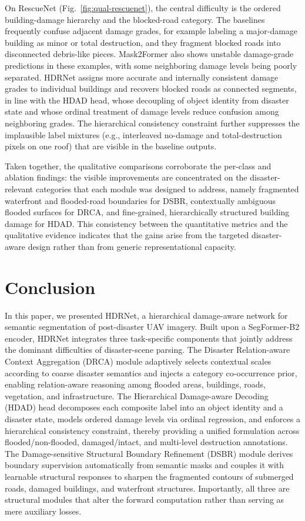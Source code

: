 \documentclass[lettersize,journal]{IEEEtran}
\begin{document}
On RescueNet (Fig.~\ref{fig:qual-rescuenet}), the central difficulty is the ordered building-damage hierarchy and the blocked-road category. The baselines frequently confuse adjacent damage grades, for example labeling a major-damage building as minor or total destruction, and they fragment blocked roads into disconnected debris-like pieces. Mask2Former also shows unstable damage-grade predictions in these examples, with some neighboring damage levels being poorly separated. HDRNet assigns more accurate and internally consistent damage grades to individual buildings and recovers blocked roads as connected segments, in line with the HDAD head, whose decoupling of object identity from disaster state and whose ordinal treatment of damage levels reduce confusion among neighboring grades. The hierarchical consistency constraint further suppresses the implausible label mixtures (e.g., interleaved no-damage and total-destruction pixels on one roof) that are visible in the baseline outputs.

Taken together, the qualitative comparisons corroborate the per-class and ablation findings: the visible improvements are concentrated on the disaster-relevant categories that each module was designed to address, namely fragmented waterfront and flooded-road boundaries for DSBR, contextually ambiguous flooded surfaces for DRCA, and fine-grained, hierarchically structured building damage for HDAD. This consistency between the quantitative metrics and the qualitative evidence indicates that the gains arise from the targeted disaster-aware design rather than from generic representational capacity.




\section{Conclusion}
In this paper, we presented HDRNet, a hierarchical damage-aware network for semantic segmentation of post-disaster UAV imagery. Built upon a SegFormer-B2 encoder, HDRNet integrates three task-specific components that jointly address the dominant difficulties of disaster-scene parsing. The Disaster Relation-aware Context Aggregation (DRCA) module adaptively selects contextual scales according to coarse disaster semantics and injects a category co-occurrence prior, enabling relation-aware reasoning among flooded areas, buildings, roads, vegetation, and infrastructure. The Hierarchical Damage-aware Decoding (HDAD) head decomposes each composite label into an object identity and a disaster state, models ordered damage levels via ordinal regression, and enforces a hierarchical consistency constraint, thereby providing a unified formulation across flooded/non-flooded, damaged/intact, and multi-level destruction annotations. The Damage-sensitive Structural Boundary Refinement (DSBR) module derives boundary supervision automatically from semantic masks and couples it with learnable structural responses to sharpen the fragmented contours of submerged roads, damaged buildings, and waterfront structures. Importantly, all three are structural modules that alter the forward computation rather than serving as mere auxiliary losses.
\end{document}
